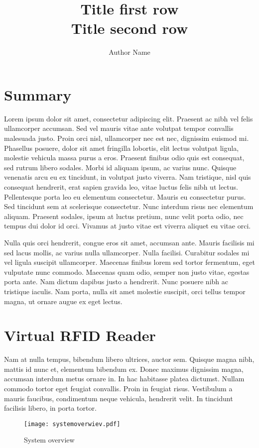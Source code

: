 \documentclass[titlepage = true]{scrartcl}
\title{Title first row\\ Title second row}
\author{Author Name}
\begin{document}
\maketitle
\clearpage
\setcounter{page}{1}
\section{Summary}
Lorem ipsum dolor sit amet, consectetur adipiscing elit. Praesent ac nibh vel felis ullamcorper accumsan. Sed vel mauris vitae ante volutpat tempor convallis malesuada justo. Proin orci nisl, ullamcorper nec est nec, dignissim euismod mi. Phasellus posuere, dolor sit amet fringilla lobortis, elit lectus volutpat ligula, molestie vehicula massa purus a eros. Praesent finibus odio quis est consequat, sed rutrum libero sodales. Morbi id aliquam ipsum, ac varius nunc. Quisque venenatis arcu eu ex tincidunt, in volutpat justo viverra. Nam tristique, nisl quis consequat hendrerit, erat sapien gravida leo, vitae luctus felis nibh ut lectus. Pellentesque porta leo eu elementum consectetur. Mauris eu consectetur purus. Sed tincidunt sem at scelerisque consectetur. Nunc interdum risus nec elementum aliquam. Praesent sodales, ipsum at luctus pretium, nunc velit porta odio, nec tempus dui dolor id orci. Vivamus at justo vitae est viverra aliquet eu vitae orci.

Nulla quis orci hendrerit, congue eros sit amet, accumsan ante. Mauris facilisis mi sed lacus mollis, ac varius nulla ullamcorper. Nulla facilisi. Curabitur sodales mi vel ligula suscipit ullamcorper. Maecenas finibus lorem sed tortor fermentum, eget vulputate nunc commodo. Maecenas quam odio, semper non justo vitae, egestas porta ante. Nam dictum dapibus justo a hendrerit. Nunc posuere nibh ac tristique iaculis. Nam porta, nulla sit amet molestie suscipit, orci tellus tempor magna, ut ornare augue ex eget lectus.

\section{Virtual RFID Reader}
Nam at nulla tempus, bibendum libero ultrices, auctor sem. Quisque magna nibh, mattis id nunc et, elementum bibendum ex. Donec maximus dignissim magna, accumsan interdum metus ornare in. In hac habitasse platea dictumst. Nullam commodo tortor eget feugiat convallis. Proin in feugiat risus. Vestibulum a mauris faucibus, condimentum neque vehicula, hendrerit velit. In tincidunt facilisis libero, in porta tortor.
\begin{figure}[h]
\begin{center}
\texttt{[image: systemoverwiev.pdf]}
\caption{System overview}
\end{center}
\end{figure}
 
\end{document}
